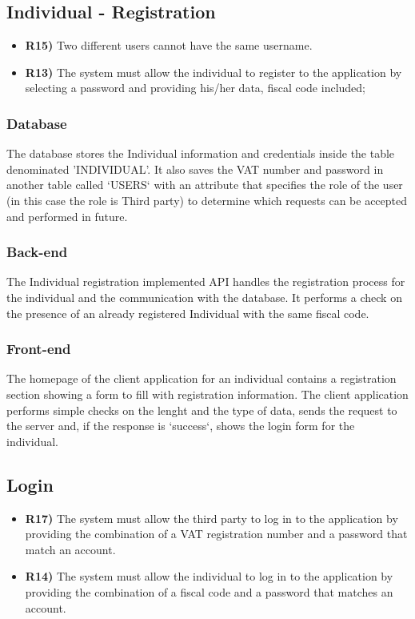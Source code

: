 \subsection{Individual - Registration}
\begin{itemize}
	\item {\color{Green}\textbf{R15)}} Two different users cannot have the same username.
	\item {\color{Green}\textbf{R13)}} The system must allow the individual to register to the application by selecting a password and providing his/her data, fiscal code included;
\end{itemize}

\subsubsection*{Database}
The database stores the Individual information and credentials inside the table denominated 'INDIVIDUAL'. It also saves the VAT number and password in another table called `USERS` with an attribute that specifies the role of the user (in this case the role is Third party) to determine which requests can be accepted and performed in future.\\

\subsubsection*{Back-end} 
The Individual registration implemented API handles the registration process for the individual and the communication with the database. It performs a check on the presence of an already registered Individual with the same fiscal code.

\subsubsection*{Front-end}
The homepage of the client application for an individual contains a registration section showing a form to fill with registration information. The client application performs simple checks on the lenght and the type of data, sends the request to the server and, if the response is `success`,  shows the login form for the individual.

\subsection{Login}
\begin{itemize}
	\item {\color{Green}\textbf{R17)}} The system must allow the third party to log in to the application by providing the combination of a VAT registration number and a password that match an account.
		\item {\color{Green}\textbf{R14)}} The system must allow the individual to log in to the application by providing the combination of a fiscal code and a password that matches an account.
\end{itemize}

